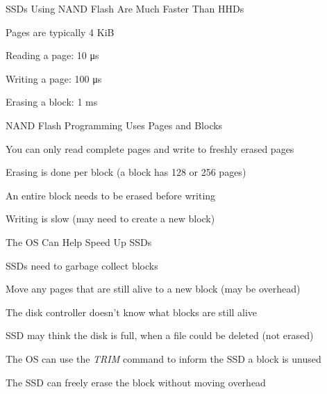   \begin{frame}{SSDs Using NAND Flash Are Much Faster Than HHDs}

    Pages are typically 4 KiB


    \vspace{2em}

    Reading a page: 10 μs

    Writing a page: 100 μs

    Erasing a block: 1 ms
  \end{frame}

  \begin{frame}{NAND Flash Programming Uses Pages and Blocks}

    You can only read complete pages and write to freshly erased pages

    \vspace{2em}

    Erasing is done per block (a block has 128 or 256 pages)

    \hspace{2em} An entire block needs to be erased before writing

    \vspace{2em}

    Writing is slow (may need to create a new block)
  \end{frame}

  \begin{frame}{The OS Can Help Speed Up SSDs}

    SSDs need to garbage collect blocks

    \hspace{2em} Move any pages that are still alive to a new block (may be overhead)

    \vspace{2em}

    The disk controller doesn't know what blocks are still alive

    \hspace{2em} SSD may think the disk is full, when a file could be deleted (not erased)

    \vspace{2em}

    The OS can use the \textit{TRIM} command to inform the SSD a block is unused

    \hspace{2em} The SSD can freely erase the block without moving overhead
  \end{frame}

